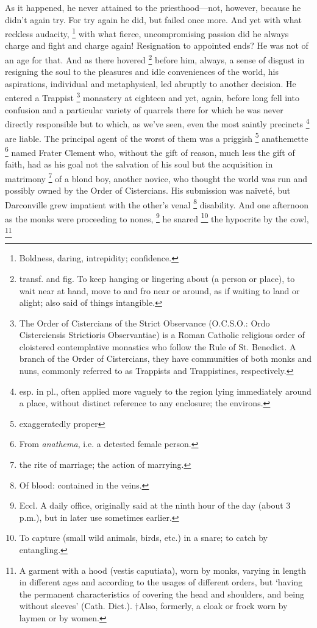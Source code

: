   As it happened, he never attained to the priesthood—not, however, because he
didn’t again try. For try again he did, but failed once more. And yet with what
reckless audacity, 
\footnote{Boldness, daring, intrepidity; confidence. }
with what fierce, uncompromising passion did he always charge
and fight and charge again! Resignation to appointed ends? He was not of an age
for that. And as there hovered 
\footnote{transf. and fig. To keep hanging or lingering about (a person or place), 
to wait near at hand, move to and fro near or around, as if waiting to land or alight;
also said of things intangible.
 }
before him, always, a sense of disgust in
resigning the soul to the pleasures and idle conveniences of the world, his
aspirations, individual and metaphysical, led abruptly to another decision. He
entered a Trappist 
\footnote{The Order of Cistercians of the Strict Observance (O.C.S.O.: 
Ordo Cisterciensis Strictioris Observantiae) is a Roman Catholic religious 
order of cloistered contemplative monastics who follow the Rule of 
St. Benedict. A branch of the Order of Cistercians, they have communities 
of both monks and nuns, commonly referred to as Trappists and Trappistines, 
respectively.
}
monastery at eighteen and yet, again, before long fell into
confusion and a particular variety of quarrels there for which he was never
directly responsible but to which, as we’ve seen, even the most saintly
precincts 
\footnote{esp. in pl., often applied more vaguely to the region lying 
immediately around a place, without distinct reference to any enclosure; 
the environs. 
}
are liable. The principal agent of the worst of them was a priggish
\footnote{exaggeratedly proper}
anathemette 
\footnote{\textdbend From \textit{anathema}, i.e. a detested female person.
}
named Frater Clement who, without the gift of reason, much less the
gift of faith, had as his goal not the salvation of his soul but the acquisition
in matrimony 
\footnote{the rite of marriage; the action of marrying.}
of a blond boy, another novice, who thought the world was run and
possibly owned by the Order of Cistercians. 
His submission was naïveté, but Darconville grew impatient with the other’s venal 
\footnote{Of blood: contained in the veins.}
disability. And one afternoon as the monks were proceeding to nones, 
\footnote{Eccl. A daily office, originally said at the ninth hour of the day
 (about 3 p.m.), but in later use sometimes earlier. 
 }
he snared 
\footnote{To capture (small wild animals, birds, etc.) in a snare; to catch by entangling. }
the hypocrite by the cowl,
\footnote{A garment with a hood (vestis caputiata), worn by monks, varying in 
length in different ages and according to the usages of different orders, but 
‘having the permanent characteristics of covering the head and shoulders, 
and being without sleeves’ (Cath. Dict.). †Also, formerly, a cloak or frock worn 
by laymen or by women.
}
